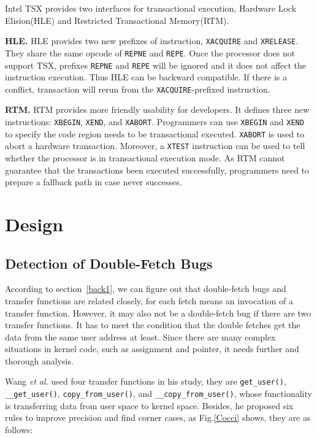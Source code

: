 \documentclass[10pt]{llncs}
\begin{document}
Intel TSX provides two interfaces for transactional execution, Hardware Lock Elision(HLE) and Restricted Transactional Memory(RTM).

\textbf{HLE.} HLE provides two new prefixes of instruction, \verb:XACQUIRE: and \verb:XRELEASE:. They share the same opcode of \verb:REPNE: and \verb:REPE:. Once the processor does not support TSX, prefixes \verb:REPNE: and \verb:REPE: will be ignored and it does not affect the instruction execution. Thus HLE can be backward compatible. If there is a conflict, transaction will rerun from the \verb:XACQUIRE:-prefixed instruction.

\textbf{RTM.} RTM provides more friendly usability for developers. It defines three new instructions: \verb:XBEGIN:, \verb:XEND:, and \verb:XABORT:. Programmers can use \verb:XBEGIN: and \verb:XEND: to specify the code region needs to be transactional executed. \verb:XABORT: is used to abort a hardware transaction. Moreover, a \verb:XTEST: instruction can be used to tell whether the processor is in transactional execution mode. As RTM cannot guarantee that the transactions been executed successfully, programmers need to prepare a fallback path in case never successes.

\section{Design}%
\label{design}

\subsection{Detection of Double-Fetch Bugs}
\label{design1}
According to section~\ref{back1}, we can figure out that double-fetch bugs and transfer functions are related closely, for each fetch means an invocation of a transfer function. However, it may also not be a double-fetch bug if there are two transfer functions. It has to meet the condition that the double fetches get the data from the same user address at least. Since there are many complex situations in kernel code, such as assignment and pointer, it needs further and thorough analysis.

Wang \textit{et al.} used four transfer functions in his study, they are \verb:get_user():, \verb:__get_user():, \verb:copy_from_user():, and \verb:__copy_from_user():, whose functionality is transferring data from user space to kernel space. Besides, he proposed six rules to improve precision and find corner cases, as Fig.\ref{Cocci} shows, they are as follows:
\end{document}
